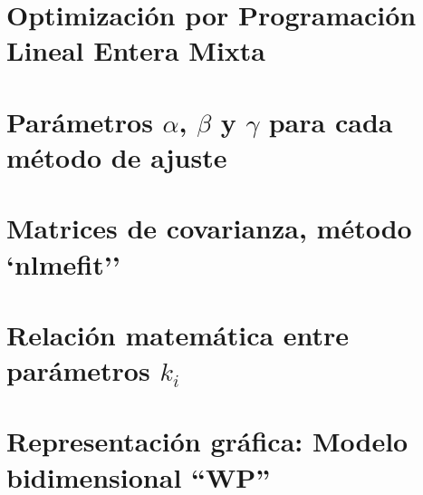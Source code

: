 \documentclass[11pt,twoside,draft]{report}
\begin{document}
    \chapter{Optimización por Programación Lineal Entera Mixta}
    \label{milpanexus}
    

    \chapter{Parámetros $\alpha$, $\beta$ y $\gamma$ para cada método de ajuste}
    \label{tabAllParamsanexus}
    

    \chapter{Matrices de covarianza, método `nlmefit''}
    \label{covarMatrixanexus}
    

    \chapter{Relación matemática entre parámetros $k_{i}$}
    \label{kiParamsanexus}
    

    \chapter{Representación gráfica: Modelo bidimensional ``WP''}
    \label{edoModelanexus}
    
\end{document}
